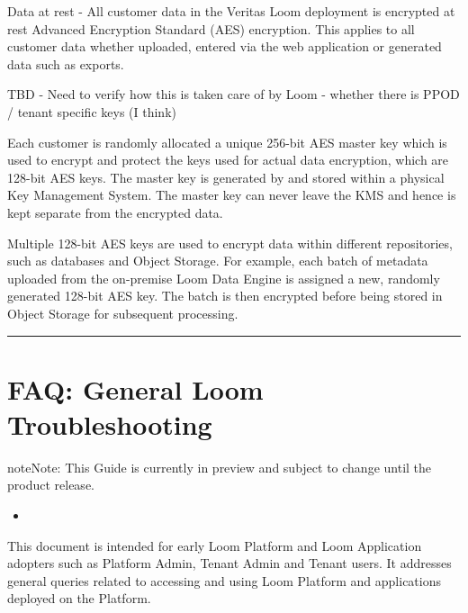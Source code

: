 \documentclass[letterpaper,10pt,english]{sphinxmanual}
\begin{document}
Data at rest - All customer data in the Veritas Loom deployment is encrypted at rest Advanced Encryption Standard (AES) encryption. This applies to all customer data whether uploaded, entered via the web application or generated data such as exports.

TBD - Need to verify how this is taken care of by Loom - whether there is PPOD / tenant specific keys (I think)

Each customer is randomly allocated a unique 256-bit AES master key which is used to encrypt and protect the keys used for actual data encryption, which are 128-bit AES keys. The master key is generated by and stored within a physical Key Management System. The master key can never leave the KMS and hence is kept separate from the encrypted data.

Multiple 128-bit AES keys are used to encrypt data within different repositories, such as databases and Object Storage. For example, each batch of metadata uploaded from the on-premise Loom Data Engine is assigned a new, randomly generated 128-bit AES key. The batch is then encrypted before being stored in Object Storage for subsequent processing.


\bigskip\hrule\bigskip



\chapter{FAQ: General Loom Troubleshooting}
\label{\detokenize{loom_trbs_faq:faq-general-loom-troubleshooting}}\label{\detokenize{loom_trbs_faq:ifaq-loom-trbs-general}}
\begin{sphinxadmonition}{note}{Note:}
This Guide is currently in preview and subject to change until the product release.
\end{sphinxadmonition}

\begin{sphinxShadowBox}
\begin{itemize}
\item {} 
\label{\detokenize{loom_trbs_faq:id56}}{\hyperref[\detokenize{loom_trbs_faq:loom-activation-and-access}]{}}

\end{itemize}
\end{sphinxShadowBox}

This document is intended for early Loom Platform and Loom Application adopters such as Platform Admin, Tenant Admin and Tenant users.  It addresses general queries related to accessing and using Loom Platform and applications deployed on the Platform.
\end{document}
